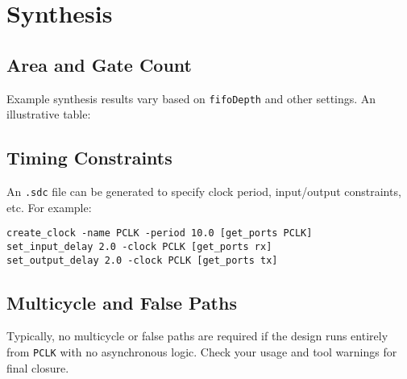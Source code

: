 \section{Synthesis}

\subsection{Area and Gate Count}
Example synthesis results vary based on \texttt{fifoDepth} and other settings. An illustrative table:







\subsection{Timing Constraints}
An \texttt{.sdc} file can be generated to specify clock period, input/output constraints, etc. For example:
\begin{verbatim}
create_clock -name PCLK -period 10.0 [get_ports PCLK]
set_input_delay 2.0 -clock PCLK [get_ports rx]
set_output_delay 2.0 -clock PCLK [get_ports tx]
\end{verbatim}

\subsection{Multicycle and False Paths}
Typically, no multicycle or false paths are required if the design runs entirely from \texttt{PCLK} with no asynchronous logic. Check your usage and tool warnings for final closure.
